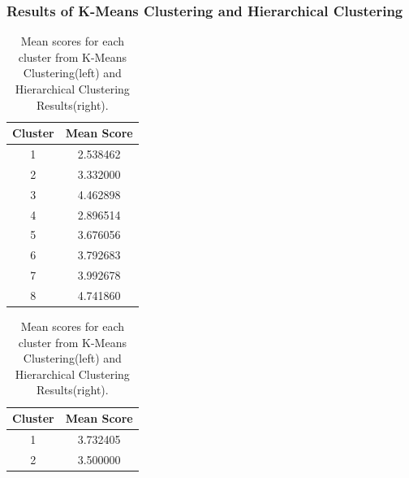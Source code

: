 \documentclass[8pt]{report}
\begin{document}
\subsubsection{Results of K-Means Clustering and Hierarchical Clustering}

\begin{table}[H]
\centering
\begin{tabular}{cc}
    \hline
    \textbf{Cluster} & \textbf{Mean Score} \\
    \hline
    1 & 2.538462 \\
    2 & 3.332000 \\
    3 & 4.462898 \\
    4 & 2.896514 \\
    5 & 3.676056 \\
    6 & 3.792683 \\
    7 & 3.992678 \\
    8 & 4.741860 \\
    \hline
    \end{tabular}
\begin{tabular}{cc}
\hline
\textbf{Cluster} & \textbf{Mean Score} \\
\hline
1 & 3.732405 \\
2 & 3.500000 \\
\hline
\end{tabular}
\caption{Mean scores for each cluster from K-Means Clustering(left) and Hierarchical Clustering Results(right).}
\label{table:hclust_scores_kmeans_scores}
\end{table}
\end{document}
